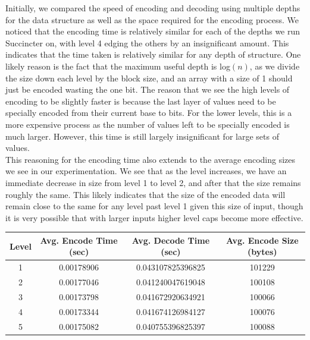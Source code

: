 \documentclass{article}
\begin{document}
Initially, we compared the speed of encoding and decoding using multiple depths for the data structure as well as the space required for the encoding process. We noticed that the encoding time is relatively similar for each of the depths we run Succincter on, with level 4 edging the others by an insignificant amount. This indicates that the time taken is relatively similar for any depth of structure. One likely reason is the fact that the maximum useful depth is log$(n)$, as we divide the size down each level by the block size, and an array with a size of 1 should just be encoded wasting the one bit. The reason that we see the high levels of encoding to be slightly faster is because the last layer of values need to be specially encoded from their current base to bits. For the lower levels, this is a more expensive process as the number of values left to be specially encoded is much larger. However, this time is still largely insignificant for large sets of values. \\

This reasoning for the encoding time also extends to the average encoding sizes we see in our experimentation. We see that as the level increases, we have an immediate decrease in size from level 1 to level 2, and after that the size remains roughly the same. This likely indicates that the size of the encoded data will remain close to the same for any level past level 1 given this size of input, though it is very possible that with larger inputs higher level caps become more effective. \\

\begin{center}\smallskip
    \begin{tabular}{ | c | c | c | c |}
    \hline
    Level & Avg. Encode Time (sec) & Avg. Decode Time (sec) & Avg. Encode Size (bytes) \\ \hline
    1 & 0.00178906 & 0.043107825396825 & 101229\\
    2 & 0.00177046 & 0.041240047619048 & 100108\\
    3 & 0.00173798 & 0.041672920634921 & 100066\\
    4 & 0.00173344 & 0.041674126984127 & 100076\\
    5 & 0.00175082 & 0.040755396825397 & 100088\\ \hline
    \end{tabular}
\end{center}
\end{document}
